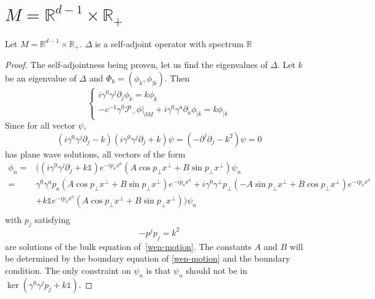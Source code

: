 \section{$M = \mathbb{R}^{d-1} \times \mathbb{R}_+$}\label{wen-subsect1}
\begin{proposition}
Let $M = \mathbb{R}^{d-1} \times \mathbb{R}_+$. $\Delta$ is a self-adjoint operator with spectrum $\mathbb{R}$
\end{proposition}
\begin{proof}
The self-adjointness being proven, let us find the eigenvalues of $\Delta$. 
Let $k$ be an eigenvalue of $\Delta$ and $\Phi_k = (\phi_k, \phi_{| k})$. Then
\begin{equation}\label{wen-motion2}
\begin{cases}
i \gamma^0 \gamma^j \partial_j \phi_k = k \phi_k \\
-c^{-1} \gamma^0 \mathcal{P}_- \phi\vert_{\partial M} + i \gamma^0 \gamma^a \partial_a \phi_{| k} = k \phi_{| k}
\end{cases}
\end{equation}
Since for all vector $\psi$,
\begin{equation*}
(i\gamma^0 \gamma^j\partial_j - k )(i\gamma^0 \gamma^j\partial_j + k )\psi = 
(- \partial^j\partial_j - k^2) \psi = 0
\end{equation*}
has plane wave solutions, 
all vectors of the form
\begin{equation*}
\begin{split}
\phi_n = & \Big((i\gamma^0\gamma^j\partial_j + k \mathbb{1}) e^{-ip_a x^a }(A\cos p_\bot x^\bot + B \sin p_\bot x^\bot) \psi_n \\
 = &\gamma^0\gamma^a p_a (A \cos p_\bot x^\bot + B \sin p_\bot x^\bot)e^{-ip_a x^a}
+ i\gamma^0\gamma^\bot p_\bot (-A \sin p_\bot x^\bot + B \cos p_\bot x^\bot) e^{-ip_a x^a} \\
& + k \mathbb{1} e^{-ip_a x^a}(A\cos p_\bot x^\bot + B \sin p_\bot x^\bot)\Big)\psi_n  \\
\end{split}
\end{equation*}
with $p_j$ satisfying
\begin{equation*}
- p^j p_j = k^2
\end{equation*}
are solutions of the bulk equation of~\cref{wen-motion}. 
The constants $A$ and $B$ will be determined by the boundary equation of \cref{wen-motion} and the boundary condition. 
The only constraint on $\psi_n$ is that $\psi_n$ should not be in $\ker( \gamma^0 \gamma^j p_j + k \mathbb{1})$. 

\end{proof}

